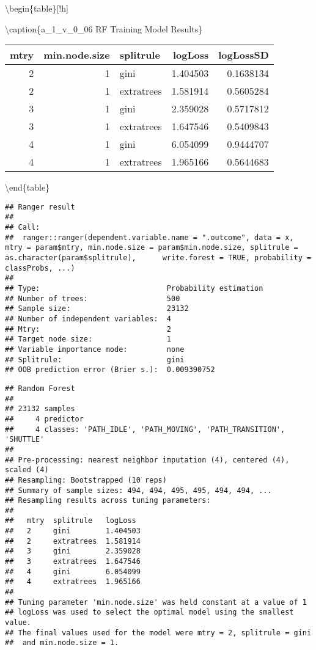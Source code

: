 \documentclass[]{article}
\begin{document}
\textbackslash{}begin\{table\}{[}!h{]}

\textbackslash{}caption\{\label{tab:a_1_v_0_06-rf-params}a\_1\_v\_0\_06
RF Training Model Results\} \centering

\begin{tabular}[t]{rrlrr}
\toprule
mtry & min.node.size & splitrule & logLoss & logLossSD\\
\midrule
2 & 1 & gini & 1.404503 & 0.1638134\\
2 & 1 & extratrees & 1.581914 & 0.5605284\\
3 & 1 & gini & 2.359028 & 0.5717812\\
3 & 1 & extratrees & 1.647546 & 0.5409843\\
4 & 1 & gini & 6.054099 & 0.9444707\\
4 & 1 & extratrees & 1.965166 & 0.5644683\\
\bottomrule
\end{tabular}

\textbackslash{}end\{table\}

\begin{verbatim}
## Ranger result
## 
## Call:
##  ranger::ranger(dependent.variable.name = ".outcome", data = x,      mtry = param$mtry, min.node.size = param$min.node.size, splitrule = as.character(param$splitrule),      write.forest = TRUE, probability = classProbs, ...) 
## 
## Type:                             Probability estimation 
## Number of trees:                  500 
## Sample size:                      23132 
## Number of independent variables:  4 
## Mtry:                             2 
## Target node size:                 1 
## Variable importance mode:         none 
## Splitrule:                        gini 
## OOB prediction error (Brier s.):  0.009390752
\end{verbatim}

\begin{verbatim}
## Random Forest 
## 
## 23132 samples
##     4 predictor
##     4 classes: 'PATH_IDLE', 'PATH_MOVING', 'PATH_TRANSITION', 'SHUTTLE' 
## 
## Pre-processing: nearest neighbor imputation (4), centered (4), scaled (4) 
## Resampling: Bootstrapped (10 reps) 
## Summary of sample sizes: 494, 494, 495, 495, 494, 494, ... 
## Resampling results across tuning parameters:
## 
##   mtry  splitrule   logLoss 
##   2     gini        1.404503
##   2     extratrees  1.581914
##   3     gini        2.359028
##   3     extratrees  1.647546
##   4     gini        6.054099
##   4     extratrees  1.965166
## 
## Tuning parameter 'min.node.size' was held constant at a value of 1
## logLoss was used to select the optimal model using the smallest value.
## The final values used for the model were mtry = 2, splitrule = gini
##  and min.node.size = 1.
\end{verbatim}
\end{document}
